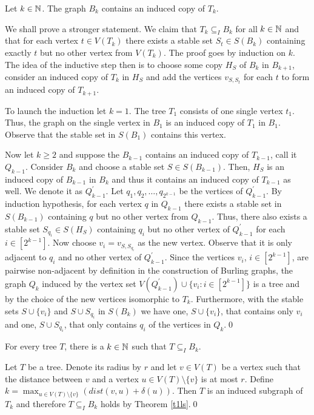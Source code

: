 \begin{thm}\label{t1ls}
Let $k\in\mathbb{N}$. The graph $B_k$ contains an induced copy of $T_k$.
\end{thm}

\begin{prf}
We shall prove a stronger statement. We claim that $T_k\subseteq_I B_k$ for all $k\in\mathbb{N}$ and that for each vertex $t\in V(T_k)$ there exists a stable set $S_t\in S(B_k)$ containing exactly $t$ but no other vertex from $V(T_k)$. The proof goes by induction on $k$. The idea of the inductive step then is to choose some copy $H_S$ of $B_k$ in $B_{k+1}$, consider an induced copy of $T_k$ in $H_S$ and add the vertices $v_{S,S_t}$ for each $t$ to form an induced copy of $T_{k+1}$.

To launch the induction let $k=1$. The tree $T_1$ consists of one single vertex $t_1$. Thus, the graph on the single vertex in $B_1$ is an induced copy of $T_1$ in $B_1$. Observe that the stable set in $S(B_1)$ contains this vertex.

Now let $k\geq 2$ and suppose the $B_{k-1}$ contains an induced copy of $T_{k-1}$, call it $Q_{k-1}$. Consider $B_k$ and choose a stable set $S\in S(B_{k-1})$. Then, $H_S$ is an induced copy of $B_{k-1}$ in $B_k$ and thus it contains an induced copy of $T_{k-1}$ as well. We denote it as $Q_{k-1}^\prime$. Let $q_1, q_2,\dots , q_{2^{k-1}}$ be the vertices of $Q_{k-1}^\prime$. By induction hypothesis, for each vertex $q$ in $Q_{k-1}$ there exists a stable set in $S(B_{k-1})$ containing $q$ but no other vertex from $Q_{k-1}$. Thus, there also exists a stable set $S_{q_i}\in S(H_S)$ containing $q_i$ but no other vertex of $Q_{k-1}^\prime$ for each $i\in [2^{k-1}]$. Now choose $v_i=v_{S,S_{q_i}}$ as the new vertex. Observe that it is only adjacent to $q_i$ and no other vertex of $Q_{k-1}^\prime$. Since the vertices $v_i$, $i\in [2^{k-1}]$, are pairwise non-adjacent by definition in the construction of Burling graphs, the graph $Q_k$ induced by the vertex set $V(Q_{k-1}^\prime)\cup \lbrace v_i:i\in [2^{k-1}]\rbrace$ is a tree and by the choice of the new vertices isomorphic to $T_k$. Furthermore, with the stable sets $S\cup \lbrace v_i\rbrace$ and $S\cup S_{q_i}$ in $S(B_k)$ we have one, $S\cup \lbrace v_i\rbrace$, that contains only $v_i$ and one, $S\cup S_{q_i}$, that only contains $q_i$ of the vertices in $Q_k$.\qed
\end{prf}

\begin{cor}
For every tree $T$, there is a $k\in\mathbb{N}$ such that $T\subseteq_I B_k$.
\end{cor}
\begin{prf}
Let $T$ be a tree. Denote its radius by $r$ and let $v\in V(T)$ be a vertex such that the distance between $v$ and a vertex $u\in V(T)\setminus \lbrace v\rbrace$ is at most $r$. Define $k=\max_{u\in V(T)\setminus \lbrace v\rbrace} (dist(v,u)+\delta (u))$. Then $T$ is an induced subgraph of $T_k$ and therefore $T\subseteq_I B_k$ holds by Theorem \ref{t1ls}.\qed
\end{prf}